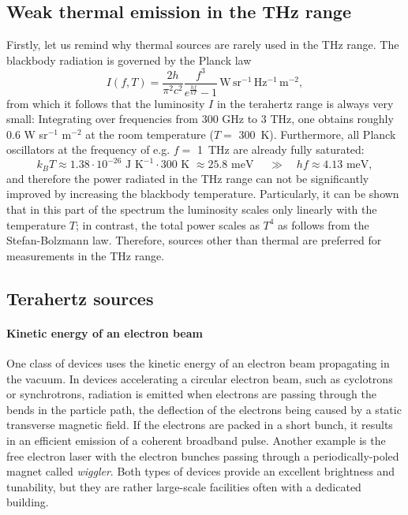 \subsection{Weak thermal emission in the THz range}%
Firstly, let us remind why thermal sources are rarely used in the THz range. The blackbody radiation is governed by the Planck law %
\begin{equation}I(f, T) = \frac{2 h}{\pi^2 c^2}\frac{f^3}{e^{\frac{h f}{kT}}-1} \mathrm{\,W\,sr^{-1}\,Hz^{-1}\,m^{-2}}, \label{eq_planck}\end{equation}
from which it follows that the luminosity $I$ in the terahertz range is always very small: Integrating over frequencies from 300 GHz to 3 THz, one obtains roughly 0.6 W sr$^{-1}$ m$^{-2}$ at the room temperature ($T=$ 300~K).  Furthermore, all Planck oscillators at the frequency of e.g. $f =$ 1~THz are already fully saturated:
$$k_B T \approx 1.38\cdot 10^{-26} \text{ J K}^{-1} \cdot 300 \text{ K~} \approx 25.8 \text{ meV } \quad\gg\quad h f \approx 4.13 \text{ meV}, $$
and therefore the power radiated in the THz range can not be significantly improved by increasing the blackbody temperature. Particularly, it can be shown that in this part of the spectrum the luminosity scales only linearly with the temperature $T$; in contrast, the total power scales as $T^{4}$ as follows from the Stefan-Bolzmann law. Therefore, sources other than thermal are preferred for measurements in the THz range.

\subsection{Terahertz sources}
\paragraph{Kinetic energy of an electron beam} %
One class of devices uses the kinetic energy of an electron beam propagating in the vacuum. In devices accelerating a circular electron beam, such as cyclotrons or synchrotrons, radiation is emitted when electrons are passing through the bends in the particle path, the deflection of the electrons being caused by a static transverse magnetic field. If the electrons are packed in a short bunch, it results in an efficient emission of a coherent broadband pulse. %
Another example is the free electron laser with the electron bunches %
passing through a periodically-poled magnet called \textit{wiggler}. 
Both types of devices provide an excellent brightness and tunability, but they are rather large-scale facilities often with a dedicated building. 

